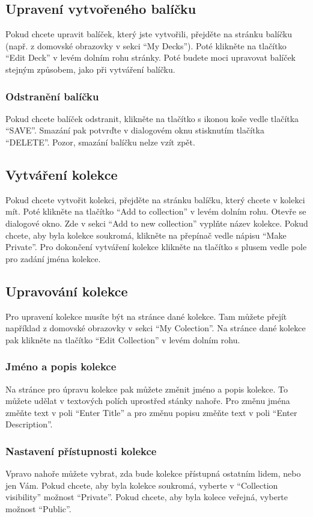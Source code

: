 \documentclass[a4paper,12pt]{article}
\begin{document}
\subsection{Upravení vytvořeného balíčku}
Pokud chcete upravit balíček, který jste vytvořili, přejděte na stránku balíčku (např. z domovské obrazovky v sekci \enquote{My Decks}). Poté klikněte na tlačítko \enquote{Edit Deck} v levém dolním rohu stránky. Poté budete moci upravovat balíček stejným způsobem, jako při vytváření balíčku.

\subsubsection*{Odstranění balíčku}
Pokud chcete balíček odstranit, klikněte na tlačítko s ikonou koše vedle tlačítka \enquote{SAVE}. Smazání pak potvrďte v dialogovém oknu stisknutím tlačítka \enquote{DELETE}. Pozor, smazání balíčku nelze vzít zpět.

\subsection{Vytváření kolekce}
Pokud chcete vytvořit kolekci, přejděte na stránku balíčku, který chcete v kolekci mít. Poté klikněte na tlačítko \enquote{Add to collection} v levém dolním rohu. Otevře se dialogové okno. Zde v sekci \enquote{Add to new collection} vyplňte název kolekce. Pokud chcete, aby byla kolekce soukromá, klikněte na přepínač vedle nápisu \enquote{Make Private}. Pro dokončení vytváření kolekce klikněte na tlačítko s plusem vedle pole pro zadání jména kolekce.

\subsection{Upravování kolekce}
Pro upravení kolekce musíte být na stránce dané kolekce. Tam můžete přejít například z domovské obrazovky v sekci \enquote{My Colection}. Na stránce dané kolekce pak klikněte na tlačítko \enquote{Edit Collection} v levém dolním rohu.

\subsubsection*{Jméno a popis kolekce}
Na stránce pro úpravu kolekce pak můžete změnit jméno a popis kolekce. To můžete udělat v textových polích uprostřed stánky nahoře. Pro změnu jména změňte text v poli \enquote{Enter Title} a pro změnu popisu změňte text v poli \enquote{Enter Description}.
\subsubsection*{Nastavení přístupnosti kolekce}
Vpravo nahoře můžete vybrat, zda bude kolekce přístupná ostatním lidem, nebo jen Vám. Pokud chcete, aby byla kolekce soukromá, vyberte v \enquote{Collection visibility} možnost \enquote{Private}. Pokud chcete, aby byla kolece veřejná, vyberte možnost \enquote{Public}.
\end{document}
